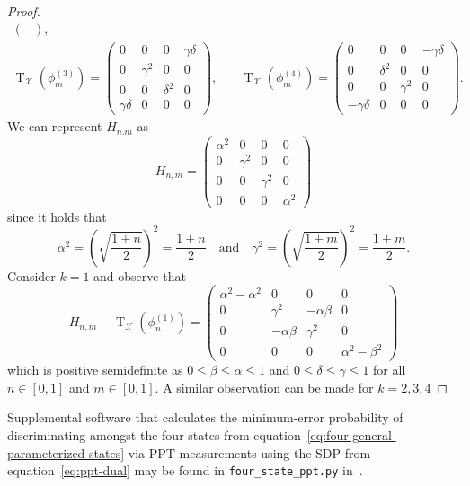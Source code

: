 \documentclass[11pt]{article}
\theoremstyle{definition}
\newcommand{\pt}{\operatorname{T}}
\newcommand{\X}{\mathcal{X}}
\begin{document}
\begin{proof}
\begin{equation}
\begin{aligned}
\begin{pmatrix}
            \end{pmatrix}, \\ 
            \pt_{\X}\left(\phi_m^{(3)}\right) = 
            \begin{pmatrix}
                0 & 0 & 0 & \gamma\delta \\
                0 & \gamma^2 & 0 & 0 \\
                0 & 0 & \delta^2 & 0 \\
                \gamma\delta & 0 & 0 & 0
            \end{pmatrix}, &\quad 
            \pt_{\X} \left(\phi_m^{(4)}\right) = 
            \begin{pmatrix}
                0 & 0 & 0 & -\gamma\delta \\
                0 & \delta^2 & 0 & 0 \\
                0 & 0 & \gamma^2 & 0 \\
                -\gamma\delta & 0 & 0 & 0
            \end{pmatrix}.
        \end{aligned}
    \end{equation}
    We can represent $H_{n.m}$ as
    \begin{equation}
        H_{n,m} = 
        \begin{pmatrix}
            \alpha^2 & 0 & 0 & 0 \\
            0 & \gamma^2 & 0 & 0 \\
            0 & 0 & \gamma^2 & 0 \\
            0 & 0 & 0 & \alpha^2
        \end{pmatrix}
    \end{equation}
    since it holds that
    \begin{equation}
        \alpha^2 = \left(\sqrt{\frac{1+n}{2}}\right)^2 = \frac{1 + n}{2} 
        \quad \text{and} \quad 
        \gamma^2 = \left(\sqrt{\frac{1+m}{2}}\right)^2 = \frac{1 + m}{2}.
    \end{equation}
    Consider $k=1$ and observe that
    \begin{equation}
        H_{n,m} - \pt_{\X}\left(\phi_n^{(1)}\right) = 
        \begin{pmatrix}
            \alpha^2 - \alpha^2 & 0 & 0 & 0 \\
            0 & \gamma^2 & -\alpha\beta & 0 \\
            0 & -\alpha\beta & \gamma^2 & 0 \\
            0 & 0 & 0 & \alpha^2 - \beta^2
        \end{pmatrix}
    \end{equation}
    which is positive semidefinite as $0 \leq \beta \leq \alpha \leq 1$ and $0
    \leq \delta \leq \gamma \leq 1$ for all $n \in [0,1]$ and $m \in [0,1]$. A
    similar observation can be made for $k = 2, 3, 4$
\end{proof}
Supplemental software that calculates the minimum-error probability of
discriminating amongst the four states from
equation~\eqref{eq:four-general-parameterized-states} via PPT measurements
using the SDP from equation~\eqref{eq:ppt-dual} may be found in
\texttt{four\_state\_ppt.py} in~\cite{russo2020ppt}.
\end{document}
